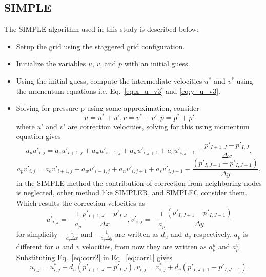 \documentclass{article}
\numberwithin{equation}{section}
\numberwithin{figure}{section}
\begin{document}
\subsection{SIMPLE}
The SIMPLE algorithm  used in this study is described below:
\begin{itemize}
    \item Setup the grid using the staggered grid configuration.
    \item Initialize the variables \( u \), \( v \), and \( p \) with an initial guess.
    \item Using the initial guess, compute the intermediate velocities \( u^\ast \) and \( v^\ast \) using the momentum equations i.e. Eq.~\ref{eq:x_u_v3} and \ref{eq:y_u_v3}.
    \item Solving for  pressure  p using some approximation, consider 
    \begin{equation}
        u = u^\ast + u',  v = v^\ast + v', p = p^\ast +p' 
        \label{eq:corr1}
    \end{equation}
    where $u'$ and $v'$ are correction velocities, solving for this using momentum equation gives
    \begin{equation}
        a_p u'_{i,j} = a_e u'_{i+1,j} + a_w u'_{i-1,j} +a_n u'_{i,j+1} +a_s u'_{i,j-1} - \frac{p'_{I+1,J}-p'_{I,J}}{\Delta x},
    \end{equation}
    \begin{equation}
        a_p v'_{i,j} = a_e v'_{i+1,j} + a_w v'_{i-1,j} +a_n v'_{i,j+1} +a_s v'_{i,j-1} - \frac{(p'_{I,J+1}-p'_{I,J-1})}{\Delta y},
    \end{equation}
    in the SIMPLE method the contribution of correction from neighboring nodes is neglected, other method like SIMPLER, and SIMPLEC consider them. Which results the  correction velocities as
    \begin{equation}
    u'_{i,j}=-\frac{1}{a_p}\frac{p'_{I+1,J}-p'_{I,J}}{\Delta x}, v'_{i,j}=-\frac{1}{a_p}\frac{(p'_{I,J+1}-p'_{I,J-1})}{\Delta y}
    \label{eq:corr2}
    \end{equation}
    for simplicity  $-\frac{1}{a_p \Delta x}$ and $-\frac{1}{a_p \Delta y}$ are written as $d_u$ and $d_v$ respectively. $a_p$ is different for $u$ and $v$ velocities, from now they are written as $a_p^u$ and $a_p^v$. Substituting   Eq.~\ref{eq:corr2} in Eq.~\ref{eq:corr1} gives
    \begin{equation}
        u_{i,j} = u^\ast_{i,j} +d_u(p'_{I+1,J}-p'_{I,J}), v_{i,j} =v^\ast_{i,j}+d_v(p'_{I,J+1}-p'_{I,J-1}).
        \label{eq:corr3}
    \end{equation}

\end{itemize}
\end{document}

